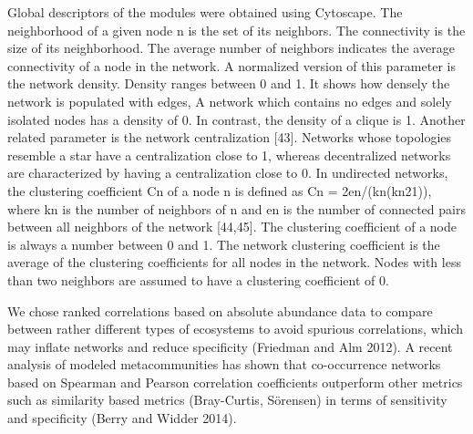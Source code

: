 \documentclass[a4paper]{article}
\begin{document}
Global descriptors of the modules were obtained using Cytoscape. The neighborhood of a given node n is the set of its neighbors. The connectivity is the size of its neighborhood. The average number of neighbors indicates the average connectivity of a node in the network. A normalized version of this parameter is the network density. Density ranges between 0 and 1. It shows how densely the network is populated with edges, A network which contains no edges and solely isolated nodes has a density of 0. In contrast, the density of a clique is 1. Another related parameter is the network centralization [43]. Networks whose topologies resemble a star have a centralization close to 1, whereas decentralized networks are characterized by having a centralization close to 0.
In undirected networks, the clustering coefficient Cn of a node n is defined as Cn = 2en/(kn(kn21)), where kn is the number of neighbors of n and en is the number of connected pairs between all neighbors of the network [44,45]. The clustering coefficient of a node is always a number between 0 and 1. The network clustering coefficient is the average of the clustering coefficients for all nodes in the network. Nodes with less than two neighbors are assumed to have a clustering coefficient of 0.

We chose ranked correlations based on absolute abundance data to compare between rather different types of ecosystems to avoid spurious correlations, which may inflate networks and reduce specificity (Friedman and Alm 2012). A recent analysis of modeled metacommunities has shown that co-occurrence networks based on Spearman and Pearson correlation coefficients outperform other metrics such as similarity based metrics (Bray-Curtis, Sörensen) in terms of sensitivity and specificity (Berry and Widder 2014).

\end{document}
